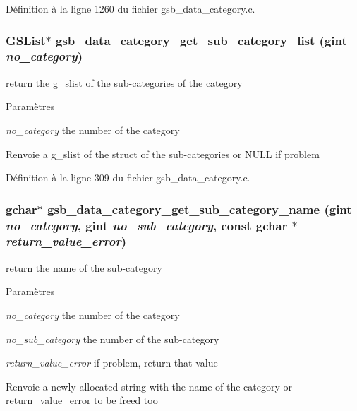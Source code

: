 Définition à la ligne 1260 du fichier gsb\_\-data\_\-category.c.

\subsubsection[{gsb\_\-data\_\-category\_\-get\_\-sub\_\-category\_\-list}]{\setlength{\rightskip}{0pt plus 5cm}GSList$\ast$ gsb\_\-data\_\-category\_\-get\_\-sub\_\-category\_\-list (gint {\em no\_\-category})}\label{gsb__data__category_8h_a5b6c6e3288cd0e25f28dd9ac1af6979f}
return the g\_\-slist of the sub-\/categories of the category


\begin{DoxyParams}{Paramètres}
\item[{\em no\_\-category}]the number of the category\end{DoxyParams}
\begin{DoxyReturn}{Renvoie}
a g\_\-slist of the struct of the sub-\/categories or NULL if problem 
\end{DoxyReturn}


Définition à la ligne 309 du fichier gsb\_\-data\_\-category.c.

\subsubsection[{gsb\_\-data\_\-category\_\-get\_\-sub\_\-category\_\-name}]{\setlength{\rightskip}{0pt plus 5cm}gchar$\ast$ gsb\_\-data\_\-category\_\-get\_\-sub\_\-category\_\-name (gint {\em no\_\-category}, \/  gint {\em no\_\-sub\_\-category}, \/  const gchar $\ast$ {\em return\_\-value\_\-error})}\label{gsb__data__category_8h_a3b5bc5fb4125a2e3e8df0c922cbee149}
return the name of the sub-\/category


\begin{DoxyParams}{Paramètres}
\item[{\em no\_\-category}]the number of the category \item[{\em no\_\-sub\_\-category}]the number of the sub-\/category \item[{\em return\_\-value\_\-error}]if problem, return that value\end{DoxyParams}
\begin{DoxyReturn}{Renvoie}
a newly allocated string with the name of the category or return\_\-value\_\-error to be freed too 
\end{DoxyReturn}


